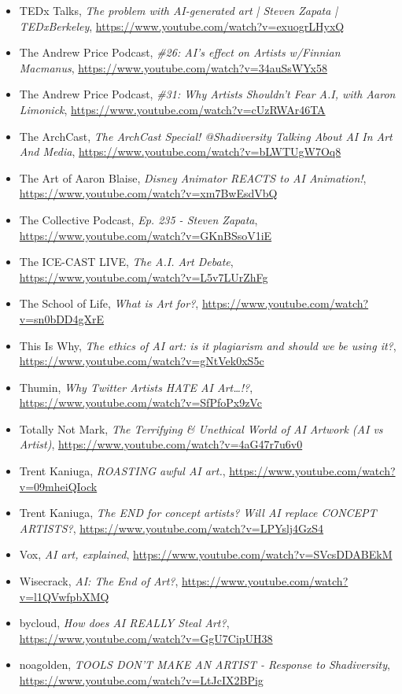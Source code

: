 \documentclass[11pt]{article}
\begin{document}
\begin{itemize}
\item TEDx Talks, \emph{The problem with AI-generated art | Steven Zapata | TEDxBerkeley}, \url{https://www.youtube.com/watch?v=exuogrLHyxQ}
\item The Andrew Price Podcast, \emph{\#26: AI's effect on Artists w/Finnian Macmanus}, \url{https://www.youtube.com/watch?v=34auSsWYx58}
\item The Andrew Price Podcast, \emph{\#31: Why Artists Shouldn’t Fear A.I, with Aaron Limonick}, \url{https://www.youtube.com/watch?v=cUzRWAr46TA}
\item The ArchCast, \emph{The ArchCast Special! @Shadiversity Talking About AI In Art And Media}, \url{https://www.youtube.com/watch?v=bLWTUgW7Oq8}
\item The Art of Aaron Blaise, \emph{Disney Animator REACTS to AI Animation!}, \url{https://www.youtube.com/watch?v=xm7BwEsdVbQ}
\item The Collective Podcast, \emph{Ep. 235 - Steven Zapata}, \url{https://www.youtube.com/watch?v=GKnBSsoV1iE}
\item The ICE-CAST LIVE, \emph{The A.I. Art Debate}, \url{https://www.youtube.com/watch?v=L5v7LUrZhFg}
\item The School of Life, \emph{What is Art for?}, \url{https://www.youtube.com/watch?v=sn0bDD4gXrE}
\item This Is Why, \emph{The ethics of AI art: is it plagiarism and should we be using it?}, \url{https://www.youtube.com/watch?v=gNtVek0xS5c}
\item Thumin, \emph{Why Twitter Artists HATE AI Art\ldots{}!?}, \url{https://www.youtube.com/watch?v=SfPfoPx9zVc}
\item Totally Not Mark, \emph{The Terrifying \& Unethical World of AI Artwork (AI vs Artist)}, \url{https://www.youtube.com/watch?v=4aG47r7u6v0}
\item Trent Kaniuga, \emph{ROASTING awful AI art.}, \url{https://www.youtube.com/watch?v=09mheiQIock}
\item Trent Kaniuga, \emph{The END for concept artists? Will AI replace CONCEPT ARTISTS?}, \url{https://www.youtube.com/watch?v=LPYslj4GzS4}
\item Vox, \emph{AI art, explained}, \url{https://www.youtube.com/watch?v=SVcsDDABEkM}
\item Wisecrack, \emph{AI: The End of Art?}, \url{https://www.youtube.com/watch?v=l1QVwfpbXMQ}
\item bycloud, \emph{How does AI REALLY Steal Art?}, \url{https://www.youtube.com/watch?v=GgU7CipUH38}
\item noagolden, \emph{TOOLS DON'T MAKE AN ARTIST - Response to Shadiversity}, \url{https://www.youtube.com/watch?v=LtJcIX2BPig}
\end{itemize}
\end{document}
